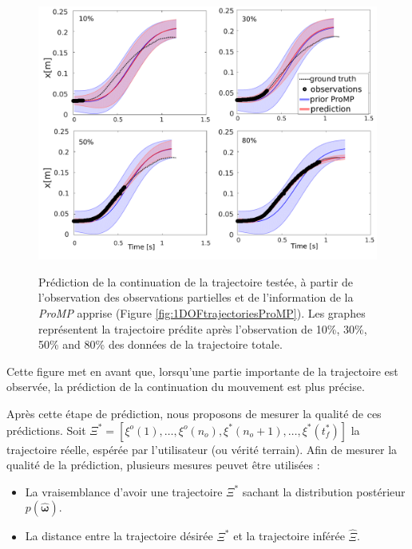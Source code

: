 \documentclass[utf8]{frontiersSCNS} %
\newcommand{\rev}[1]{\textcolor{blue}{#1}}
\begin{document}
\begin{figure}[h]
\centering
{
\includegraphics[width=15cm]{img/1DOFtrajectoriesPredictionsV2.pdf}
}
\caption{Prédiction de la continuation de la trajectoire testée, à partir de l'observation des observations partielles et de l'information de la \textit{ProMP} apprise (Figure \ref{fig:1DOFtrajectoriesProMP}). Les graphes représentent la trajectoire prédite après l'observation de 10\%, 30\%, 50\% and 80\% des données de la trajectoire totale.}
\label{fig:1DOFtrajectoriesPredictions}
\end{figure}

Cette figure met en avant que, lorsqu'une partie importante de la trajectoire est observée, la prédiction de la continuation du mouvement est plus précise.

Après cette étape de prédiction, nous proposons de mesurer la qualité de ces prédictions. Soit $\Xi^* = [\xi^o(1),\ldots, \xi^o({n_o}), \xi^*(n_o+1),\ldots, \xi^*(t^*_f)]$ la trajectoire réelle, espérée par l'utilisateur (ou vérité terrain). 
Afin de mesurer la qualité de la prédiction, plusieurs mesures peuvet être utilisées :
\begin{itemize}
\item La vraisemblance d'avoir une trajectoire $\Xi^*$ sachant la distribution postérieur $p(\boldsymbol{\hat{\omega}})$.
\item La distance entre la trajectoire désirée $\Xi^*$ et la trajectoire inférée $\hat{\Xi}$.
\end{itemize}
\end{document}
